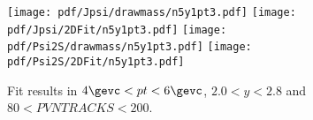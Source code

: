 \begin{figure}[H]
\begin{center}
\texttt{[image: pdf/Jpsi/drawmass/n5y1pt3.pdf]}
\texttt{[image: pdf/Jpsi/2DFit/n5y1pt3.pdf]}
\vspace*{-0.5cm}
\texttt{[image: pdf/Psi2S/drawmass/n5y1pt3.pdf]}
\texttt{[image: pdf/Psi2S/2DFit/n5y1pt3.pdf]}
\vspace*{-0.5cm}
\end{center}
\caption{Fit results in $4\gevc<pt<6\gevc$, $2.0<y<2.8$ and $80<PVNTRACKS<200$.}
\label{Fitn5y1pt3}
\end{figure}
